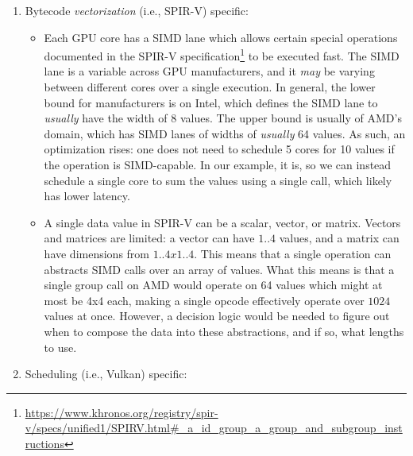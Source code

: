 \documentclass{report}
\begin{document}
\begin{enumerate}
    \item Bytecode \emph{vectorization} (i.e., SPIR-V) specific:
    \begin{itemize}
        \item Each GPU core has a SIMD lane which allows certain special operations documented in the SPIR-V specification\footnote{\url{https://www.khronos.org/registry/spir-v/specs/unified1/SPIRV.html#_a_id_group_a_group_and_subgroup_instructions}} to be executed fast. The SIMD lane is a variable across GPU manufacturers, and it \emph{may} be varying between different cores over a single execution. In general, the lower bound for manufacturers is on Intel, which defines the SIMD lane to \emph{usually} have the width of 8 values. The upper bound is usually of AMD's domain, which has SIMD lanes of widths of \emph{usually} 64 values. As such, an optimization rises: one does not need to schedule 5 cores for 10 values if the operation is SIMD-capable. In our example, it is, so we can instead schedule a single core to sum the values using a single call, which likely has lower latency.
        \item A single data value in SPIR-V can be a scalar, vector, or matrix. Vectors and matrices are limited: a vector can have $1..4$ values, and a matrix can have dimensions from $1..4 x 1..4$. This means that a single operation can abstracts SIMD calls over an array of values. What this means is that a single group call on AMD would operate on 64 values which might at most be 4x4 each, making a single opcode effectively operate over $1024$ values at once. However, a decision logic would be needed to figure out when to compose the data into these abstractions, and if so, what lengths to use.
    \end{itemize}
    \item Scheduling (i.e., Vulkan) specific:
    \begin{itemize}

\end{itemize}
\end{enumerate}
\end{document}
